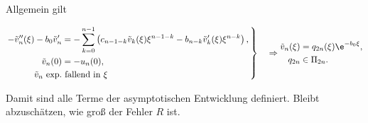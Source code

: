 \documentclass[12pt]{article}
\begin{document}
  Allgemein gilt
  \begin{tcolorbox}
   \begin{equation}\label{eq:vn}
      \left.
      \begin{aligned}
      -\tilde v''_{n}(\xi)-b_0\tilde v'_{n}
        &=-\sum\limits_{k=0}^{n-1}\left( c_{n-1-k}\tilde v_k(\xi)\xi^{n-1-k}-b_{n-k}\tilde v_k'(\xi)\xi^{n-k}\right) ,\\
            \tilde v_{n}(0)&=-u_{n}(0),\\
            \tilde v_{n} \mbox{ exp.}&\mbox{ fallend in $\xi$}
      \end{aligned}\,
      \right\}
      \quad\Rightarrow
      \begin{aligned}
      \tilde v_{n}(\xi) &= q_{2n}(\xi)\e^{-b_0\xi},\\
      q_{2n}&\in\Pi_{2n}.
      \end{aligned}
   \end{equation}
  \end{tcolorbox}
  Damit sind alle Terme der asymptotischen Entwicklung definiert. Bleibt abzuschätzen, wie groß der Fehler $R$ ist.
\end{document}
